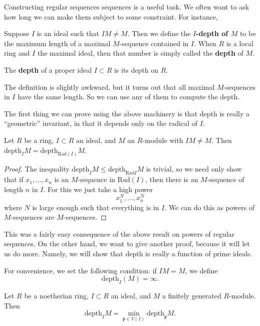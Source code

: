 Constructing regular sequences sequences is a useful task. We often want to ask
how long we can make them subject to some constraint. For instance, 

\begin{definition} 
Suppose $I$ is an ideal such that $IM \neq M$. Then we define the
\textbf{$I$-depth of $M$} to be the maximum length of a maximal $M$-sequence contained
in $I$. When $R$ is a local ring and $I$ the maximal ideal, then that number is
simply called the \textbf{depth} of $M$.

The \textbf{depth} of a proper ideal $I \subset R$ is its depth on $R$.
\end{definition} 


The definition is slightly awkward, but it turns out that all maximal
$M$-sequences in $I$ have the same length. So we can use any of them to compute
the depth. 

The first thing we can prove using the above machinery is that depth is really
a ``geometric'' invariant, in that it depends only on the radical of $I$.

\begin{proposition} 
Let $R$ be a ring, $I \subset R$ an ideal, and $M$ an $R$-module
with $IM \neq M$. Then $\mathrm{depth}_I M = \mathrm{depth}_{\mathrm{Rad}(I)} M$.
\end{proposition} 
\begin{proof} 
The inequality $\mathrm{depth}_I M \leq \mathrm{depth}_{\mathrm{Rad} I} M$ is trivial, so we need only
show that if $x_1, \dots, x_n$ is an $M$-sequence in $\mathrm{Rad}(I)$, then there is
an $M$-sequence of length $n$ in $I$. For this we just take a high power
\[ x_1^N, \dots, x_n^{N}  \]
where $N$ is large enough such that everything is in $I$. We can do this as
powers of $M$-sequences are $M$-sequences.
\end{proof} 

This was a fairly easy consequence of the above result on powers of regular
sequences. On the other hand, we want to give another proof, because it will
let us do more. Namely, we will show that depth is really a function of prime
ideals.

For convenience, we set the following condition: if $IM = M$, we define
\[ \mathrm{depth}_I (M) = \infty.  \]

\begin{proposition} 
Let $R$ be a noetherian ring, $I \subset R$ an ideal, and $M$ a finitely generated $R$-module. 
Then
\[ \mathrm{depth}_I M = \min_{\mathfrak{p} \in V(I)} \mathrm{depth}_{\mathfrak{p}} M .  \]
\end{proposition} 

